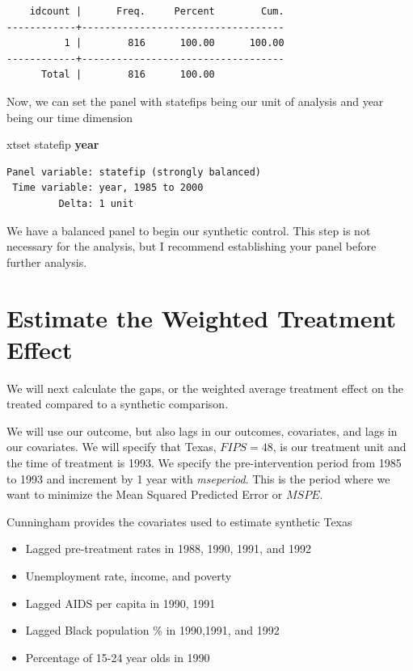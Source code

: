 \documentclass[
]{book}
\newenvironment{Shaded}{\begin{snugshade}}{\end{snugshade}}
\newcommand{\FunctionTok}[1]{\textcolor[rgb]{0.13,0.29,0.53}{\textbf{#1}}}
\newcommand{\NormalTok}[1]{#1}
\providecommand{\tightlist}{%
  \setlength{\itemsep}{0pt}\setlength{\parskip}{0pt}}
\begin{document}
\begin{verbatim}
    idcount |      Freq.     Percent        Cum.
------------+-----------------------------------
          1 |        816      100.00      100.00
------------+-----------------------------------
      Total |        816      100.00
\end{verbatim}

Now, we can set the panel with statefips being our unit of analysis and year being our time dimension

\begin{Shaded}
\begin{Highlighting}[]
\NormalTok{xtset statefip }\FunctionTok{year}
\end{Highlighting}
\end{Shaded}

\begin{verbatim}
Panel variable: statefip (strongly balanced)
 Time variable: year, 1985 to 2000
         Delta: 1 unit
\end{verbatim}

We have a balanced panel to begin our synthetic control. This step is not necessary for the analysis, but I recommend establishing your panel before further analysis.

\section{Estimate the Weighted Treatment Effect}\label{estimate-the-weighted-treatment-effect}

We will next calculate the gaps, or the weighted average treatment effect on the treated compared to a synthetic comparison.

We will use our outcome, but also lags in our outcomes, covariates, and lags in our covariates. We will specify that Texas, \(FIPS=48\), is our treatment unit and the time of treatment is 1993. We specify the pre-intervention period from 1985 to 1993 and increment by 1 year with \emph{mseperiod}. This is the period where we want to minimize the Mean Squared Predicted Error or \(MSPE\).

Cunningham provides the covariates used to estimate synthetic Texas

\begin{itemize}
\tightlist
\item
  Lagged pre-treatment rates in 1988, 1990, 1991, and 1992
\item
  Unemployment rate, income, and poverty
\item
  Lagged AIDS per capita in 1990, 1991
\item
  Lagged Black population \% in 1990,1991, and 1992
\item
  Percentage of 15-24 year olds in 1990
\end{itemize}
\end{document}
